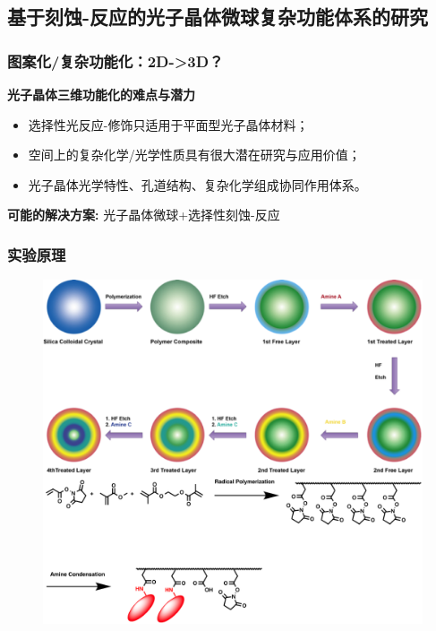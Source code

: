 \documentclass{beamer}
\begin{document}
\subsection{基于刻蚀-反应的光子晶体微球复杂功能体系的研究}

\begin{frame}
  \frametitle{图案化/复杂功能化：2D->3D？}
  \textcolor{tsinghua}{\textbf{光子晶体三维功能化的难点与潜力}}
  \begin{itemize}[<+-| alert@+>]
    \item
    选择性光反应-修饰只适用于平面型光子晶体材料；
    \item
    空间上的复杂化学/光学性质具有很大潜在研究与应用价值；
    \item
    光子晶体光学特性、孔道结构、复杂化学组成协同作用体系。
  \end{itemize}
  \pause
  \textcolor{tsinghua}{\textbf{可能的解决方案:}}
  \pause
  光子晶体微球+选择性刻蚀-反应
\end{frame}

\begin{frame}
  \frametitle{实验原理}
  \begin{figure}[t]
    \begin{center}
      \includegraphics[width=0.65\linewidth]{figures/scheme-3.png}
    \end{center}
  \end{figure}
\end{frame}
\end{document}
